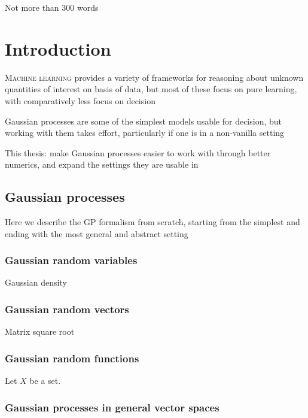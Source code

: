 \documentclass[11pt]{book}
\begin{document}
Not more than 300 words

\tableofcontents





\chapter{Introduction}

\lettrine{M}{achine learning} provides a variety of frameworks for reasoning about unknown quantities of interest on basis of data, but most of these focus on pure learning, with comparatively less focus on decision

Gaussian processes are some of the simplest models usable for decision, but working with them takes effort, particularly if one is in a non-vanilla setting

This thesis: make Gaussian processes easier to work with through better numerics, and expand the settings they are usable in

\section{Gaussian processes}

Here we describe the GP formalism from scratch, starting from the simplest and ending with the most general and abstract setting

\subsection{Gaussian random variables}

Gaussian density

\subsection{Gaussian random vectors}

Matrix square root

\subsection{Gaussian random functions}

Let $X$ be a set. 

\subsection{Gaussian processes in general vector spaces}
\end{document}
